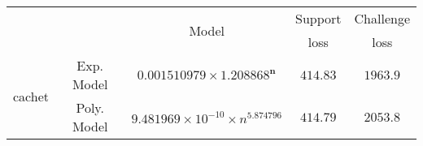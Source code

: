 \begin{tabular}{ccccc} 
\hline 
 &  & \multirow{2}{*}{Model} & Support & Challenge\tabularnewline 
 &  &  & loss  & loss\tabularnewline 
\hline 
\hline 
\multirow{2}{*}{cachet} & Exp. Model & $\mathbf{0.001510979\times 1.208868^{n}}$ & $\mathbf{414.83}$ & $\mathbf{1963.9}$ \tabularnewline 
 & Poly. Model & $9.481969\times10^{-10}\times n^{5.874796}$ & $414.79$ & $2053.8$ \tabularnewline 
\hline 
\end{tabular} 

